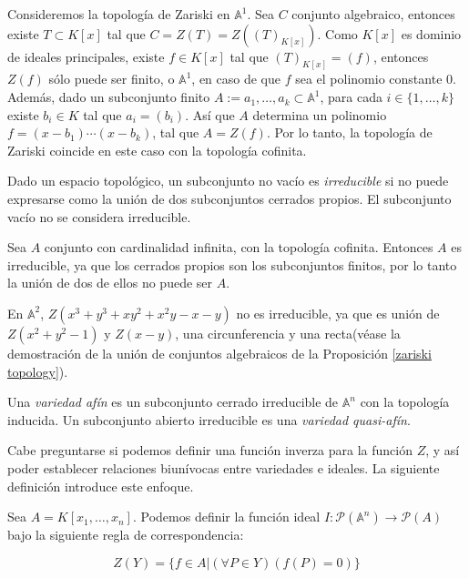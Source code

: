 \begin{example}
Consideremos la topología de Zariski en $\mathbb{A}^1$. Sea $C$ conjunto algebraico, entonces existe $T \subset K[x]$ tal que $C = Z(T) = Z((T)_{K[x]})$. Como $K[x]$ es dominio de ideales principales, existe $f \in K[x]$ tal que $(T)_{K[x]} = (f)$, entonces $Z(f)$ sólo puede ser finito, o $\mathbb{A}^1$, en caso de que $f$ sea el polinomio constante 0. Además, dado un subconjunto finito $A := {a_1,\dots,a_k}\subset\mathbb{A}^1$, para cada $i \in \{1,\dots,k\}$ existe $b_i \in K$ tal que $a_i = (b_i)$. Así que $A$ determina un polinomio $f = (x-b_1)\cdots(x-b_k)$, tal que $A = Z(f)$. Por lo tanto, la topología de Zariski coincide en este caso con la topología cofinita.
\end{example}

\begin{definition}
Dado un espacio topológico, un subconjunto no vacío es \emph{irreducible} si no puede expresarse como la unión de dos subconjuntos cerrados propios. El subconjunto vacío no se considera irreducible.
\end{definition}

\begin{example}
Sea $A$ conjunto con cardinalidad infinita, con la topología cofinita. Entonces $A$ es irreducible, ya que los cerrados propios son los subconjuntos finitos, por lo tanto la unión de dos de ellos no puede ser $A$. 
\end{example}

\begin{example}
En $\mathbb{A}^2$, $Z(x^3 + y^3 + xy^2 + x^2y - x - y)$ no es irreducible, ya que es unión de $Z(x^2 + y^2 - 1)$ y $Z(x - y)$, una circunferencia y una recta(véase la demostración de la unión de conjuntos algebraicos de la Proposición \ref{zariski topology}).
\end{example}

\begin{definition}
Una \emph{variedad afín} es un subconjunto cerrado irreducible de $\mathbb{A}^n$ con la topología inducida. Un subconjunto abierto irreducible es una \emph{variedad quasi-afín}.
\end{definition}

Cabe preguntarse si podemos definir una función inverza para la función $Z$, y así poder establecer relaciones biunívocas entre variedades e ideales. La siguiente definición introduce este enfoque.

\begin{definition}
Sea $A = K[x_1,\dots,x_n]$. Podemos definir la función ideal $I:\mathcal{P}(\mathbb{A}^n) \rightarrow \mathcal{P}(A)$ bajo la siguiente regla de correspondencia:

$$ Z(Y) = \{f \in A | (\forall P \in Y)( f(P) = 0) \} $$

\end{definition}

